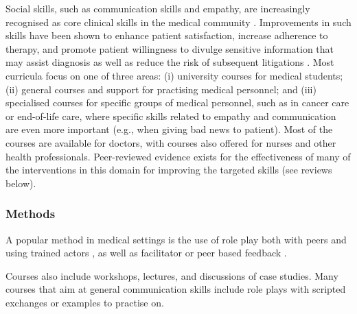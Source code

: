\documentclass[prodmode,acmtochi]{acmsmall}
\newcommand{\GeraldineFIX}[1]{}
\begin{document}
Social skills, such as communication skills and empathy, are increasingly recognised as core clinical skills in the medical community \cite{Rider2006,Barth2011,Makoul2007,Kalet2004}. Improvements in such skills have been shown to enhance patient satisfaction, increase adherence to therapy, and promote patient willingness to divulge sensitive information that may assist diagnosis as well as reduce the risk of subsequent litigations \cite{Stewart1995,Brown2008}. %
Most curricula focus on one of  three areas: (i) university courses for medical students; (ii) general courses and support for practising medical personnel; and (iii) specialised courses for specific groups of medical personnel, such as in cancer care or end-of-life care, where specific skills related to empathy and communication are even more important        (e.g., when giving bad news to patient). Most of the courses are available for doctors, with courses also offered for nurses and other health professionals. Peer-reviewed evidence exists for the effectiveness of  many of the interventions in this domain for improving the targeted skills
(see reviews below).

\subsubsection*{Methods} A popular method in medical settings is the use of role play both with peers and using trained actors  \cite{Stepien2006,Stiefel2010,Kalet2004,Barth2011}, as well as facilitator or peer based feedback \cite{Rao2007}. 
\GeraldineFIX{G: \textbf{(G: on what?\ on the role plays, or is this another method ie not clear what 'followed by' refers to ... popularity or how role play is used)}}
Courses also include workshops, lectures, and discussions of case studies. Many courses that aim at general communication skills include role plays with scripted exchanges or examples to practise on. 
 \textbf{\GeraldineFIX{G: (G:\ how are these different to role plays??) P: These a specific sub-part of role plays (i.e., you can have other role plays without scripted exchange). I believe it is worth mentioning as such scripted (iu.e., fixed) exchanges can be readily supported by technology.}}
\end{document}
